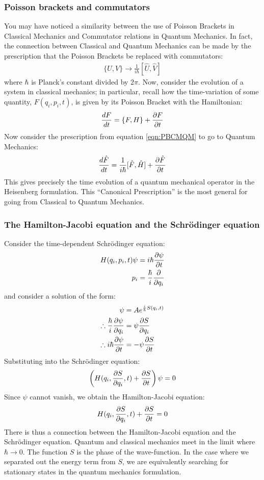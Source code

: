 \subsubsection{Poisson brackets and commutators}
You may have noticed a similarity between the use of Poisson Brackets in Classical Mechanics and Commutator relations in Quantum Mechanics. In fact, the connection between Classical and Quantum Mechanics can be made by the prescription that the Poisson Brackets be replaced with commutators:
\begin{align}
\{U,V\}\to \frac{1}{i\hbar}[\hat U,\hat V]
\label{eqn:PBCMQM}
\end{align}
where $\hbar$ is Planck's constant divided by $2\pi$.
Now, consider the evolution of a system in classical mechanics; in particular, recall how the time-variation of some quantity, $F(q_i,p_i,t)$, is given by its Poisson Bracket with the Hamiltonian:
\begin{align}
\frac{dF}{dt}=\{F,H\}+\frac{\partial F}{\partial t}
\end{align}
Now consider the prescription from equation \ref{eqn:PBCMQM} to go to Quantum Mechanics:
\begin{align}
\frac{d\hat F}{dt}=\frac{1}{i\hbar}[\hat F,\hat H]+\frac{\partial \hat F}{\partial t}
\end{align}
This gives precisely the time evolution of a quantum mechanical operator in the Heisenberg formulation. This ``Canonical Prescription'' is the most general for going from Classical to Quantum Mechanics.

\subsubsection{The Hamilton-Jacobi equation and the Schr\"odinger equation}
Consider the time-dependent Schr\"odinger equation:
\begin{align}
H(q_i,p_i,t)\psi&=i\hbar\frac{\partial \psi}{\partial t}\nonumber\\
p_i&=\frac{\hbar}{i}\frac{\partial }{\partial q_i}
\end{align}
and consider a solution of the form:
\begin{align}
\psi&=A e^{\frac{i}{\hbar}S(q_i,t)}\nonumber\\
\therefore\frac{\hbar}{i} \frac{\partial \psi}{\partial q_i}&=\psi\frac{\partial S}{\partial q_i}\nonumber\\
\therefore i\hbar \frac{\partial \psi}{\partial t}&=-\psi\frac{\partial S}{\partial t}
\end{align}
Substituting into the Schr\"odinger equation:
\begin{align}
\left(H(q_i,\frac{\partial S}{\partial q_i},t)+\frac{\partial S}{\partial t}\right)\psi=0
\end{align}
Since $\psi$ cannot vanish, we obtain the Hamilton-Jacobi equation:
\begin{align}
H(q_i,\frac{\partial S}{\partial q_i},t)+\frac{\partial S}{\partial t}=0
\end{align}
There is thus a connection between the Hamilton-Jacobi equation and the Schr\"odinger equation. Quantum and classical mechanics meet in the limit where $\hbar\to 0$. The function $S$ is the phase of the wave-function. In the case where we separated out the energy term from $S$, we are equivalently searching for stationary states in the quantum mechanics formulation.

